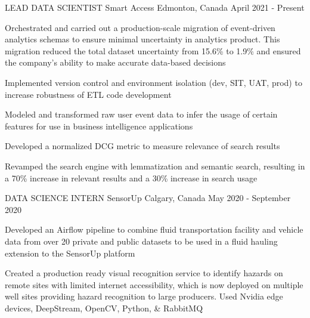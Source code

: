 
\begin{cventries}
  \cventry
    {LEAD DATA SCIENTIST} %
    {Smart Access} %
    {Edmonton, Canada} %
    {April 2021 - Present} %
    {
      \begin{cvitems} %
        \item {Orchestrated and carried out a production-scale migration of event-driven analytics schemas to ensure minimal uncertainty in analytics product. This migration reduced the total dataset uncertainty from 15.6\% to 1.9\% and ensured the company's ability to make accurate data-based decisions}
        \item {Implemented version control and environment isolation (dev, SIT, UAT, prod) to increase robustness of ETL code development}
        \item {Modeled and transformed raw user event data to infer the usage of certain features for use in business intelligence applications}
        \item {Developed a normalized DCG metric to measure relevance of search results}
        \item {Revamped the search engine with lemmatization and semantic search, resulting in a 70\% increase in relevant results and a 30\% increase in search usage}
      \end{cvitems}
    }

  \cventry
    {DATA SCIENCE INTERN} %
    {SensorUp} %
    {Calgary, Canada} %
    {May 2020 - September 2020} %
    {
      \begin{cvitems} %
        \item {Developed an Airflow pipeline to combine fluid transportation facility and vehicle data from over 20 private and public datasets to be used in a fluid hauling extension to the SensorUp platform}
        \item {Created a production ready visual recognition service to identify hazards on remote sites with limited internet accessibility, which is now deployed on multiple well sites providing hazard recognition to large producers. Used Nvidia edge devices, DeepStream, OpenCV, Python, \& RabbitMQ}
      \end{cvitems}
    }


\end{cventries}
